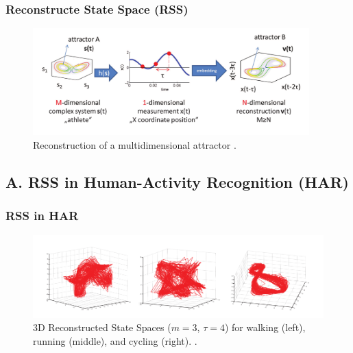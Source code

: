 \documentclass{beamer}
\begin{document}
\begin{frame}
\frametitle{Reconstructe State Space (RSS)}
\vspace{-0.7cm}


\begin{figure}[!htb]
\centering
\includegraphics[width=0.95\textwidth]{Quintana-Duque2012_Fig1}
\caption[PA]{Reconstruction of a multidimensional attractor
 \textcolor{red}{\textbf{ \cite{Quintana-Duque2012} }}.
}
\label{fig:sn}
\end{figure}

\end{frame}



\subsection{A. RSS in Human-Activity Recognition (HAR) }



\begin{frame}
\frametitle{RSS in HAR}
\vspace{-0.7cm}


\begin{figure}[!htb]
\centering
\includegraphics[width=1.05\textwidth]{frank_2012}
\caption[PA]{3D Reconstructed State Spaces ($m=3$, $\tau=4$) for walking (left), running (middle), and cycling (right).
 \textcolor{red}{\textbf{ \cite{Frank2010,Frank2012} }}.
}
\label{fig:sn}
\end{figure}

\end{frame}
\end{document}
